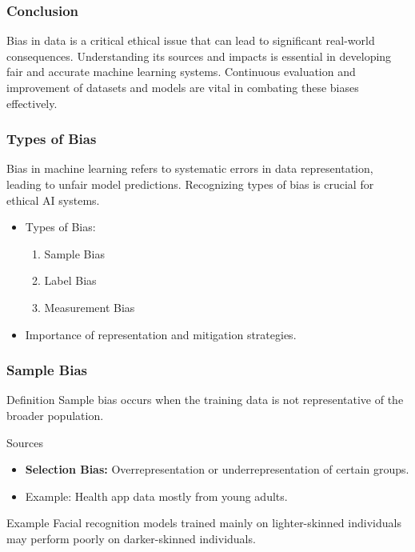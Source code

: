 \documentclass[aspectratio=169]{beamer}
\begin{document}
\begin{frame}[fragile]
    \frametitle{Conclusion}
    Bias in data is a critical ethical issue that can lead to significant real-world consequences. Understanding its sources and impacts is essential in developing fair and accurate machine learning systems. Continuous evaluation and improvement of datasets and models are vital in combating these biases effectively.
\end{frame}

\begin{frame}[fragile]
    \frametitle{Types of Bias}
    Bias in machine learning refers to systematic errors in data representation, leading to unfair model predictions. Recognizing types of bias is crucial for ethical AI systems. 
    \begin{itemize}
        \item Types of Bias:
        \begin{enumerate}
            \item Sample Bias
            \item Label Bias
            \item Measurement Bias
        \end{enumerate}
        \item Importance of representation and mitigation strategies.
    \end{itemize}
\end{frame}

\begin{frame}[fragile]
    \frametitle{Sample Bias}
    \begin{block}{Definition}
        Sample bias occurs when the training data is not representative of the broader population.
    \end{block}
    \begin{block}{Sources}
        \begin{itemize}
            \item \textbf{Selection Bias:} Overrepresentation or underrepresentation of certain groups.
            \item Example: Health app data mostly from young adults.
        \end{itemize}
    \end{block}
    \begin{block}{Example}
        Facial recognition models trained mainly on lighter-skinned individuals may perform poorly on darker-skinned individuals.
    \end{block}
\end{frame}
\end{document}
